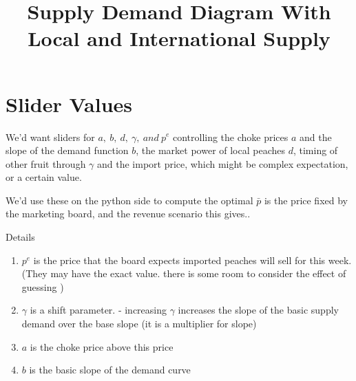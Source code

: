 \documentclass[11pt]{article}
\title{Supply Demand Diagram With Local and International Supply}
\author{}
\date{}
\begin{document}
\maketitle
\section{Slider Values}


We'd want sliders for $a,\ b,\ d,\ \gamma,\ and\ p^e$
 controlling the choke prices $a$ and the slope of the demand function $b$, the market power of local peaches $d$, timing of other fruit through $\gamma$ and the import price, which might be complex expectation, or a certain value.

We'd use these on the python side to compute the optimal
 $\bar p$ is the price fixed by the marketing board, and the revenue scenario this gives..
 

Details

\begin{enumerate}
\item $p^e$ is the price that the board expects imported peaches will sell for this week. (They may have the exact value. there is some room to consider the effect of guessing ) 

\item $\gamma$ is a shift parameter. - increasing $\gamma$ increases the slope of the basic supply demand  over the base slope (it is a multiplier for slope)

\item $a$ is the choke price above this price

\item $b$ is the basic slope of the demand curve   
\end{enumerate}
\end{document}
